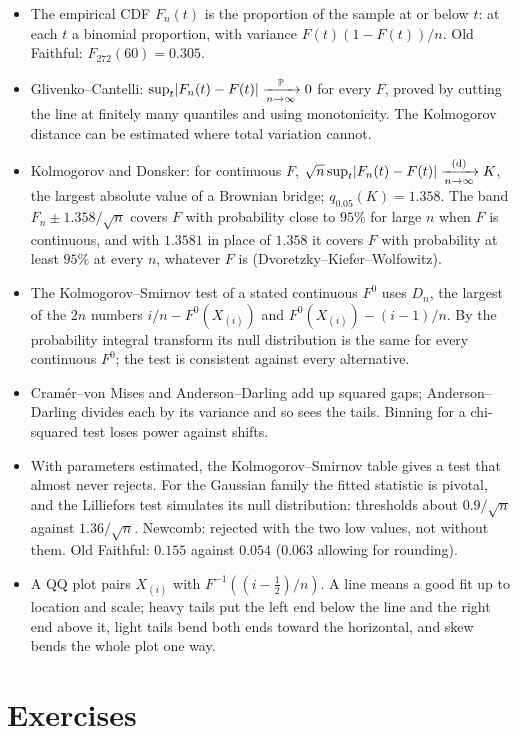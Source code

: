 \begin{itemize}[nosep]
\item The empirical CDF $F_n(t)$ is the proportion of the sample at or below $t$: at each $t$ a binomial proportion, with variance $F(t)(1 - F(t))/n$. Old Faithful: $F_{272}(60) = 0.305$.
\item Glivenko--Cantelli: $\sup_t\lvert F_n(t) - F(t)\rvert \xrightarrow [n \to \infty ]{\mathbb{P}} 0$ for every $F$, proved by cutting the line at finitely many quantiles and using monotonicity. The Kolmogorov distance can be estimated where total variation cannot.
\item Kolmogorov and Donsker: for continuous $F$, $\sqrt{n}\sup_t\lvert F_n(t) - F(t)\rvert \xrightarrow [n \to \infty ]{\text{(d)}} K$, the largest absolute value of a Brownian bridge; $q_{0.05}(K) = 1.358$. The band $F_n \pm 1.358/\sqrt{n}$ covers $F$ with probability close to $95\%$ for large $n$ when $F$ is continuous, and with $1.3581$ in place of $1.358$ it covers $F$ with probability at least $95\%$ at every $n$, whatever $F$ is (Dvoretzky--Kiefer--Wolfowitz).
\item The Kolmogorov--Smirnov test of a stated continuous $F^0$ uses $D_n$, the largest of the $2n$ numbers $i/n - F^0(X_{(i)})$ and $F^0(X_{(i)}) - (i-1)/n$. By the probability integral transform its null distribution is the same for every continuous $F^0$; the test is consistent against every alternative.
\item Cram\'er--von Mises and Anderson--Darling add up squared gaps; Anderson--Darling divides each by its variance and so sees the tails. Binning for a chi-squared test loses power against shifts.
\item With parameters estimated, the Kolmogorov--Smirnov table gives a test that almost never rejects. For the Gaussian family the fitted statistic is pivotal, and the Lilliefors test simulates its null distribution: thresholds about $0.9/\sqrt{n}$ against $1.36/\sqrt{n}$. Newcomb: rejected with the two low values, not without them. Old Faithful: $0.155$ against $0.054$ ($0.063$ allowing for rounding).
\item A QQ plot pairs $X_{(i)}$ with $F^{-1}((i - \frac12)/n)$. A line means a good fit up to location and scale; heavy tails put the left end below the line and the right end above it, light tails bend both ends toward the horizontal, and skew bends the whole plot one way.
\end{itemize}

\section{Exercises}
\label{sec:ks-exercises}

